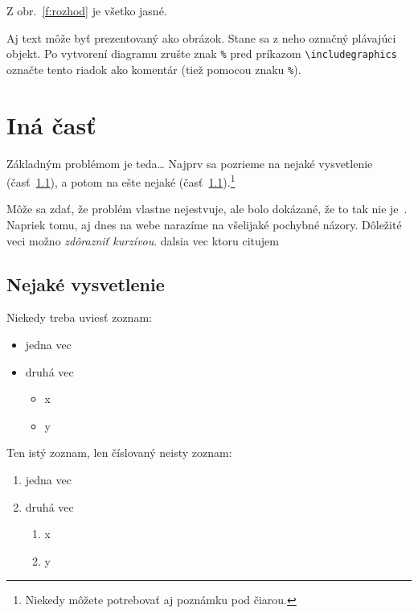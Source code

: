 \documentclass[10pt,twoside,slovak,a4paper]{coursepaper}
\begin{document}
Z obr.~\ref{f:rozhod} je všetko jasné.

\begin{figure*}[tbh]
	\centering
	Aj text môže byť prezentovaný ako obrázok. Stane sa z neho označný plávajúci objekt. Po vytvorení diagramu zrušte znak \texttt{\%} pred príkazom \verb|\includegraphics| označte tento riadok ako komentár (tiež pomocou znaku \texttt{\%}).
	\caption{Rozhodujúci argument.}
	\label{f:rozhod}
\end{figure*}



\section{Iná časť} \label{ina}

Základným problémom je teda\ldots{} Najprv sa pozrieme na nejaké vysvetlenie (časť~\ref{ina:nejake}), a potom na ešte nejaké (časť~\ref{ina:nejake}).\footnote{Niekedy môžete potrebovať aj poznámku pod čiarou.}

Môže sa zdať, že problém vlastne nejestvuje\cite{Coplien:MPD}, ale bolo dokázané, že to tak nie je~\cite{Czarnecki:Staged, Czarnecki:Progress}. Napriek tomu, aj dnes na webe narazíme na všelijaké pochybné názory\cite{PLP-Framework}. Dôležité veci možno \emph{zdôrazniť kurzívou}. dalsia vec ktoru citujem \cite{Steck_Baltrunas_Elahi_Liang_Raimond_Basilico_2021}


\subsection{Nejaké vysvetlenie} \label{ina:nejake}

Niekedy treba uviesť zoznam:

\begin{itemize}
	\item jedna vec
	\item druhá vec
	      \begin{itemize}
		      \item x
		      \item y
	      \end{itemize}
\end{itemize}

Ten istý zoznam, len číslovaný neisty zoznam:

\begin{enumerate}
	\item jedna vec
	\item druhá vec
	      \begin{enumerate}
		      \item x
		      \item y
	      \end{enumerate}
\end{enumerate}
\end{document}
